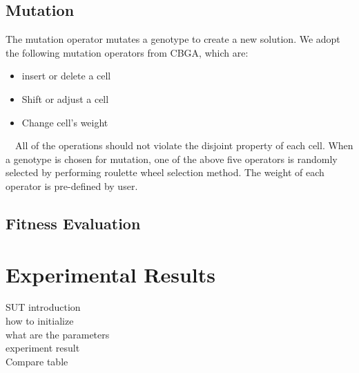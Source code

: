 \documentclass[conference]{IEEEtran}
\begin{document}
\subsection{Mutation}
The mutation operator mutates a genotype to create a new solution. We adopt the following mutation operators from CBGA, which are:
\begin{itemize}
	\item insert or delete a cell
	\item Shift or adjust a cell
	\item Change cell's weight \\
\end{itemize}
\ \ All of the operations should not violate the disjoint property of each cell. When a genotype is chosen for mutation, one of the above five operators is randomly selected by performing roulette wheel selection method. The weight of each operator is pre-defined by user.
\subsection{Fitness Evaluation}
\section{Experimental Results}
  SUT introduction\\
  how to initialize\\
  what are the parameters\\
  experiment result\\
  Compare table\\





  
%
%
\end{document}
